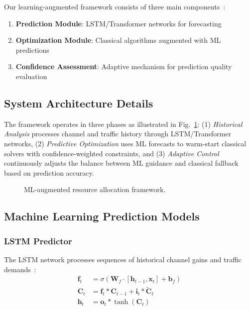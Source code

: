 \documentclass[conference]{IEEEtran}
\begin{document}
Our learning-augmented framework consists of three main components~\cite{hybrid_systems}:
\begin{enumerate}
    \item \textbf{Prediction Module}: LSTM/Transformer networks for forecasting~\cite{lstm_wireless,transformer_networks}
    \item \textbf{Optimization Module}: Classical algorithms augmented with ML predictions~\cite{warm_start_optimization}
    \item \textbf{Confidence Assessment}: Adaptive mechanism for prediction quality evaluation~\cite{adaptive_algorithms}
\end{enumerate}

\subsection{System Architecture Details}

The framework operates in three phases as illustrated in Fig.~\ref{fig:architecture}: (1) \textit{Historical Analysis} processes channel and traffic history through LSTM/Transformer networks, (2) \textit{Predictive Optimization} uses ML forecasts to warm-start classical solvers with confidence-weighted constraints, and (3) \textit{Adaptive Control} continuously adjusts the balance between ML guidance and classical fallback based on prediction accuracy.

\begin{figure}[!t]
\centering
\scriptsize
\setlength{\fboxsep}{3pt}
\vspace{-0.5em}
\caption{ML-augmented resource allocation framework.}
\label{fig:architecture}
\vspace{-1em}
\end{figure}

\subsection{Machine Learning Prediction Models}

\subsubsection{LSTM Predictor}
The LSTM network processes sequences of historical channel gains and traffic demands~\cite{lstm_wireless,rnn_wireless}:
\begin{align}
\mathbf{f}_t &= \sigma(\mathbf{W}_f \cdot [\mathbf{h}_{t-1}, \mathbf{x}_t] + \mathbf{b}_f) \\
\mathbf{C}_t &= \mathbf{f}_t * \mathbf{C}_{t-1} + \mathbf{i}_t * \mathbf{\tilde{C}}_t \\
\mathbf{h}_t &= \mathbf{o}_t * \tanh(\mathbf{C}_t)
\end{align}
\end{document}
